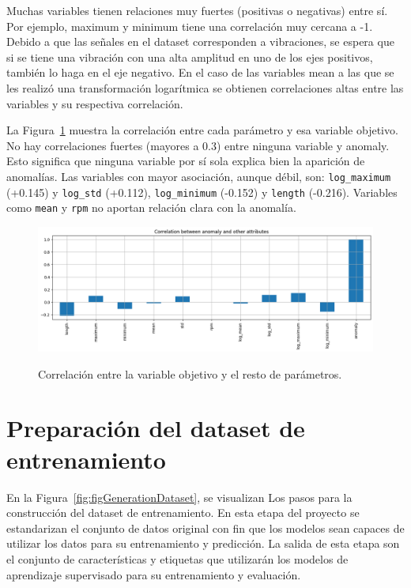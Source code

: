 \documentclass[11pt,a4paper,spanish]{book}
\numberwithin{equation}{chapter}
\numberwithin{figure}{chapter}
\begin{document}
Muchas variables tienen relaciones muy fuertes (positivas o negativas) entre sí. 
Por ejemplo,  maximum y minimum tiene una correlación muy cercana a -1. 
Debido a que las señales en el dataset corresponden a vibraciones, se espera que si se 
tiene una vibración con una alta amplitud en uno de los ejes positivos, 
también lo haga en el eje negativo. En el caso de las variables mean a las que se les 
realizó una transformación logarítmica se obtienen correlaciones altas entre 
las variables y su respectiva correlación. 


La Figura~\ref{fig:figCorrMatTarget} muestra 
la correlación entre cada parámetro y esa variable objetivo. No hay correlaciones fuertes
(mayores a 0.3) entre ninguna variable y anomaly. 
Esto significa que ninguna variable por sí sola explica bien la aparición de anomalías. 
Las variables con mayor asociación, aunque débil, son: \lstinline|log_maximum| (+0.145) y 
\lstinline|log_std| (+0.112), \lstinline|log_minimum| (-0.152) y \lstinline|length| (-0.216).
Variables como \lstinline|mean| y \lstinline|rpm| no aportan relación clara con la anomalía.


\begin{figure}[H]
    \caption{Correlación entre la variable objetivo y el resto de parámetros.}
    \centering
    \includegraphics[width=1\textwidth]{media/dataset/corr-mat-target.png}
    \label{fig:figCorrMatTarget}
\end{figure}



\section{Preparación del dataset de entrenamiento}


En la Figura~\ref{fig:figGenerationDataset}, se visualizan Los pasos para la construcción 
del dataset de entrenamiento. 
En esta etapa del proyecto se estandarizan el conjunto de datos original con fin que los 
modelos sean 
capaces de utilizar los datos para su entrenamiento y predicción. La salida de esta etapa
son el conjunto de características y etiquetas que utilizarán los modelos de aprendizaje 
supervisado para su entrenamiento y evaluación. 
\end{document}
